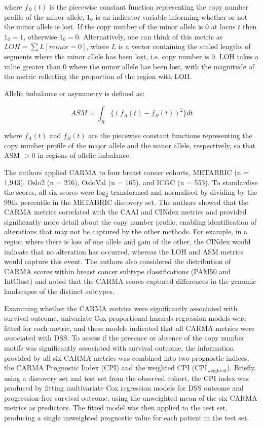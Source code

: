 where $f_B(t)$ is the piecewise constant function representing the copy number profile of the minor allele, $1_0$ is an indicator variable informing whether or not the minor allele is lost. If the copy number of the minor allele is 0 at locus $t$ then $1_0 = 1$, otherwise $1_0 =0$. Alternatively, one can think of this metric as $LOH = \sum L[minor = 0]$, where $L$ is a vector containing the scaled lengths of segments where the minor allele has been lost, i.e. copy number is 0. LOH takes a value greater than 0 where the minor allele has been lost, with the magnitude of the metric reflecting the proportion of the region with LOH. 

Allelic imbalance or asymmetry is defined as:  

\begin{equation}
ASM = \int_{R}{\{(f_A(t) - f_B(t))^2\}} dt
\end{equation}

where $f_A(t)$ and $f_B(t)$ are the piecewise constant functions representing the copy number profile of the major allele and the minor allele, respectively, so that ASM $> 0$ in regions of allelic imbalance. 

The authors applied CARMA to four breast cancer cohorts, METABRIC (n = 1,943), Oslo2 (n = 276), OsloVal (n = 165), and ICGC (n = 553). To standardise the scores, all six scores were log$_2$-transformed and normalised by dividing by the 99th percentile in the METABRIC discovery set. The authors showed that the CARMA metrics correlated with the CAAI and CINdex metrics and provided significantly more detail about the copy number profile, enabling identification of alterations that may not be captured by the other methods. For example, in a region where there is loss of one allele and gain of the other, the CINdex would indicate that no alteration has occurred, whereas the LOH and ASM metrics would capture this event. The authors also considered the distribution of CARMA scores within breast cancer subtype classifications (PAM50 and IntClust) and noted that the CARMA scores captured differences in the genomic landscapes of the distinct subtypes. 

Examining whether the CARMA metrics were significantly associated with survival outcome, univariate Cox proportional hazards regression models were fitted for each metric, and these models indicated that all CARMA metrics were associated with DSS. To assess if the presence or absence of the copy number motifs was significantly associated with survival outcome, the information provided by all six CARMA metrics was combined into two prognostic indices, the CARMA Prognostic Index (CPI) and the weighted CPI ($\text{CPI}_\text{weighted}$). Briefly, using a discovery set and test set from the observed cohort, the CPI index was produced by fitting multivariate Cox regression models for DSS outcome and progression-free survival outcome, using the unweighted mean of the six CARMA metrics as predictors. The fitted model was then applied to the test set, producing a single unweighted prognostic value for each patient in the test set. 


